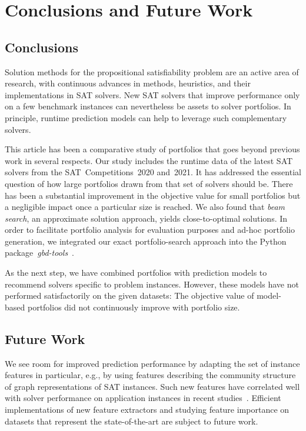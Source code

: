 \documentclass[a4paper,USenglish,pdfa]{lipics-v2021} %
\begin{document}
\section{Conclusions and Future Work}
\label{sec:conclusion}

\subsection{Conclusions}

Solution methods for the propositional satisfiability problem are an active area of research, with continuous advances in methods, heuristics, and their implementations in SAT solvers. 
New SAT solvers that improve performance only on a few benchmark instances can nevertheless be assets to solver portfolios. 
In principle, runtime prediction models can help to leverage such complementary solvers. 

This article has been a comparative study of portfolios that goes beyond previous work in several respects.
Our study includes the runtime data of the latest SAT solvers from the SAT~Competitions~2020 and~2021. 
It has addressed the essential question of how large portfolios drawn from that set of solvers should be.
There has been a substantial improvement in the objective value for small portfolios but a negligible impact once a particular size is reached. 
We also found that \emph{beam search}, an approximate solution approach, yields close-to-optimal solutions.
In order to facilitate portfolio analysis for evaluation purposes and ad-hoc portfolio generation, we integrated our exact portfolio-search approach into the Python package~\emph{gbd-tools}~\cite{iser2020collaborative}. 

As the next step, we have combined portfolios with prediction models to recommend solvers specific to problem instances.
However, these models have not performed satisfactorily on the given datasets:
The objective value of model-based portfolios did not continuously improve with portfolio size.

\subsection{Future Work}

We see room for improved prediction performance by adapting the set of instance features in particular,
e.g., by using features describing the community structure of graph representations of SAT instances.
Such new features have correlated well with solver performance on application instances in recent studies~\cite{Ansotegui:2009:StructureIndustrial,Ansotegui:2017:StructureFeatures,Ansotegui:2019:CommunityStructure,Li:2021:HCS}. 
Efficient implementations of new feature extractors and studying feature importance on datasets that represent the state-of-the-art are subject to future work. 
\end{document}
